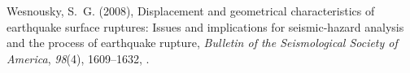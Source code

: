 \documentclass[twocolumn,grl]{AGUTeX}
\begin{document}
\begin{article}
\begin{thebibliography}{30}
Wesnousky, S.~G. (2008), Displacement and geometrical characteristics of
  earthquake surface ruptures: Issues and implications for seismic-hazard
  analysis and the process of earthquake rupture, \textit{Bulletin of the
  Seismological Society of America}, \textit{98}(4), 1609--1632,
  .

\end{thebibliography}



\end{article}


%
%
\end{document}
